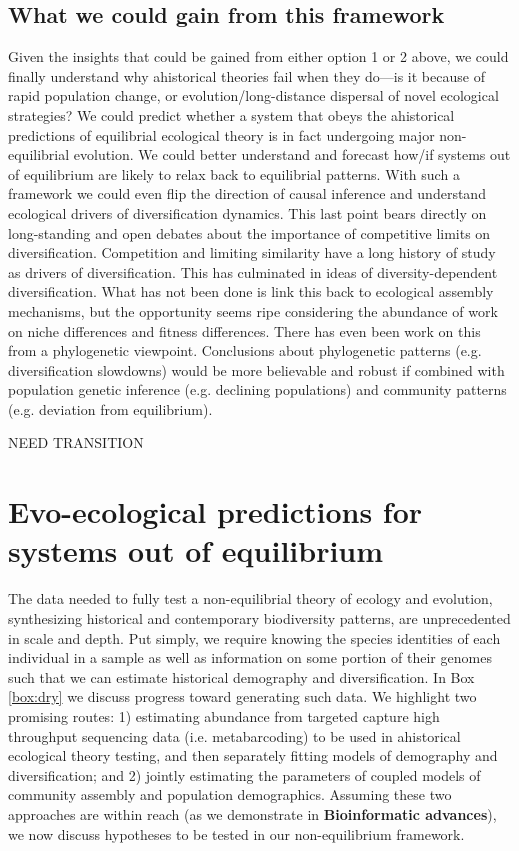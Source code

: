 \documentclass[12pt]{article}
\newcounter{Box}
\begin{document}
\subsection{What we could gain from this framework}

Given the insights that could be gained from either option 1 or 2
above, we could finally understand why ahistorical theories fail when
they do---is it because of rapid population change, or
evolution/long-distance dispersal of novel ecological strategies? We
could predict whether a system that obeys the ahistorical predictions
of equilibrial ecological theory is in fact undergoing major
non-equilibrial evolution. We could better understand and forecast
how/if systems out of equilibrium are likely to relax back to
equilibrial patterns. With such a framework we could even flip the
direction of causal inference and understand ecological drivers of
diversification dynamics. This last point bears directly on
long-standing and open debates about the importance of competitive
limits on diversification. Competition and limiting similarity have a
long history of study as drivers of diversification. This has
culminated in ideas of diversity-dependent
diversification\citep{Etienne2012-ky, Rabosky2013-gk, Rabosky2008-bs}.
What has not been done is link this back to ecological assembly
mechanisms, but the opportunity seems ripe considering the abundance
of work on niche differences and fitness
differences\citep{Chesson2000-uc, Adler2007-pl, HilleRisLambers2012-xt,
  Levine2009-qj}.  There has even been work on this from a
phylogenetic viewpoint\citep{Mayfield2010-hg, Godoy2014-iv}.
Conclusions about phylogenetic patterns (e.g. diversification
slowdowns) would be more believable and robust if combined with
population genetic inference (e.g. declining populations) and
community patterns (e.g.  deviation from equilibrium).

NEED TRANSITION

\section{Evo-ecological predictions for systems out of equilibrium}

The data needed to fully test a non-equilibrial theory of ecology and
evolution, synthesizing historical and contemporary biodiversity
patterns, are unprecedented in scale and depth. Put simply, we require
knowing the species identities of each individual in a sample as well
as information on some portion of their genomes such that we can
estimate historical demography and diversification. In Box
\ref{box:dry} we discuss progress toward generating such data. We
highlight two promising routes: 1) estimating abundance from targeted
capture high throughput sequencing data (i.e.  metabarcoding) to be
used in ahistorical ecological theory testing, and then separately
fitting models of demography and diversification; and 2) jointly
estimating the parameters of coupled models of community assembly and
population demographics. Assuming these two approaches are within
reach (as we demonstrate in \textbf{Bioinformatic advances}), we now
discuss hypotheses to be tested in our non-equilibrium framework.
\end{document}
